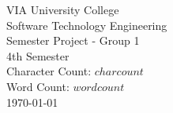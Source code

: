 \thispagestyle{empty}
\vspace*{0.15\textheight}
\begin{center}
    {\Large VIA University College}\\[1em]
    {\Large Software Technology Engineering}\\[2em]      
    {\Large Semester Project - Group 1}\\[1em]
    {\Large 4th Semester}\\[4em]
    {\large Character Count: $charcount$}\\[0.5em]
    {\large Word Count: $wordcount$}\\[2em]
    {\large \today}\\[1em]
\end{center}
\vfill
\clearpage